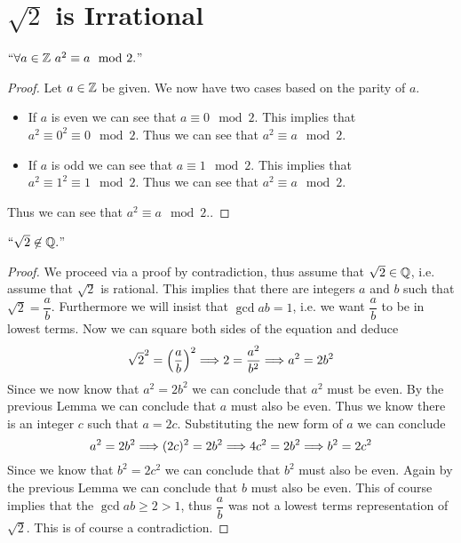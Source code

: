    \section{$\sqrt{2}$ is Irrational}
        \begin{lemma}
            $``\forall a \in \mathbb{Z} \ a^2 \equiv a \mod 2.$''
        \end{lemma}
        \begin{proof}
            Let $a \in \mathbb{Z}$ be given. We now have two cases based on the parity of $a$.
            \begin{itemize}
                \item
                    If $a$ is even we can see that $a \equiv 0 \mod 2$. This implies that
                    $a^2 \equiv 0^2 \equiv 0 \mod 2$. Thus we can see that $a^2 \equiv a \mod 2$.
                \item
                    If $a$ is odd we can see that $a \equiv 1 \mod 2$. This implies that
                    $a^2 \equiv 1^2 \equiv 1 \mod 2$. Thus we can see that $a^2 \equiv a \mod 2$.
            \end{itemize}
            Thus we can see that $a^2 \equiv a \mod 2.$. \QED
        \end{proof}
        \begin{theorem}
            $``\sqrt{2} \not\in \mathbb{Q}.$''
        \end{theorem}
        \begin{proof}
            We proceed via a proof by contradiction, thus assume that $\sqrt{2} \in \mathbb{Q}$,
            i.e. assume that $\sqrt{2}$ is rational. This implies that there are integers
            $a$ and $b$ such that $\sqrt{2} = \dfrac{a}{b}$. Furthermore we will insist that
            $\gcd{a}{b} = 1$, i.e. we want $\dfrac{a}{b}$ to be in lowest terms. Now we can square
            both sides of the equation and deduce 
            \[
                \sqrt{2}^2 = \left(\dfrac{a}{b}\right)^2 \Longrightarrow 2 = \dfrac{a^2}{b^2} \Longrightarrow a^2 = 2b^2
            \]
            Since we now know that $a^2 = 2b^2$ we can conclude that $a^2$ must be even. By the
            previous Lemma we can conclude that $a$ must also be even. Thus we know there is an
            integer $c$ such that $a = 2c$. Substituting the new form of $a$ we can conclude
            \[
                a^2 = 2b^2 \Longrightarrow (2c)^2 = 2b^2 \Longrightarrow 4c^2 = 2b^2 \Longrightarrow b^2 = 2c^2
            \]
            Since we know that $b^2 = 2c^2$ we can conclude that $b^2$ must also be even. Again
            by the previous Lemma we can conclude that $b$ must also be even. This of course implies
            that the $\gcd{a}{b} \ge 2 > 1$, thus $\dfrac{a}{b}$ was not a lowest terms representation
            of $\sqrt{2}$. This is of course a contradiction. \QED
        \end{proof}
